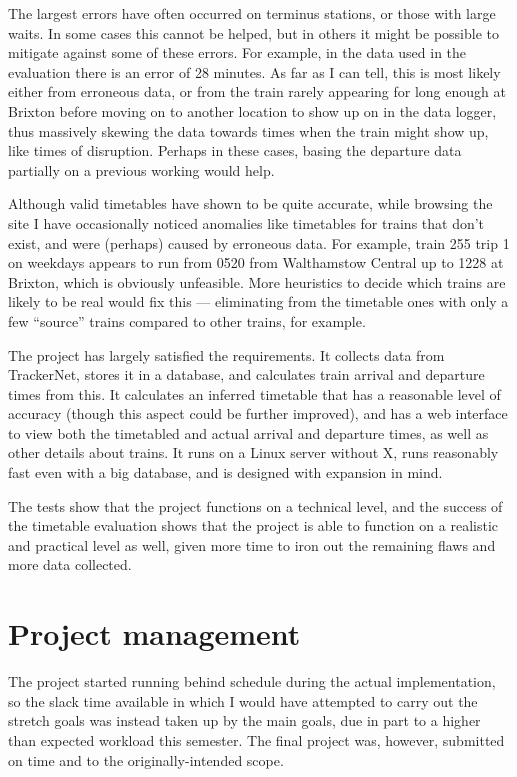 \documentclass[a4paper,12pt,twoside]{report}
\begin{document}
The largest errors have often occurred on terminus stations, or those with
large waits. In some cases this cannot be helped, but in others it might be
possible to mitigate against some of these errors. For example, in the data 
used in the evaluation there is an error of 28 minutes. As far as I can tell,
this is most likely either from erroneous data, or from the train rarely
appearing for long enough at Brixton before moving on to another location to
show up on in the data logger, thus massively skewing the data towards times
when the train might show up, like times of disruption. Perhaps in these cases,
basing the departure data partially on a previous working would help.

Although valid timetables have shown to be quite accurate, while browsing the
site I have occasionally noticed anomalies like timetables for trains that
don't exist, and were (perhaps) caused by erroneous data. For example, train
255 trip 1 on weekdays appears to run from 0520 from Walthamstow Central up to
1228 at Brixton, which is obviously unfeasible. More heuristics to decide which
trains are likely to be real would fix this --- eliminating from the timetable
ones with only a few ``source'' trains compared to other trains, for example.

The project has largely satisfied the requirements. It collects data from
TrackerNet, stores it in a database, and calculates train arrival and departure
times from this. It calculates an inferred timetable that has a reasonable
level of accuracy (though this aspect could be further improved), and has a web
interface to view both the timetabled and actual arrival and departure times,
as well as other details about trains. It runs on a Linux server without X,
runs reasonably fast even with a big database, and is designed with expansion
in mind.

The tests show that the project functions on a technical level, and the success
of the timetable evaluation shows that the project is able to function on a
realistic and practical level as well, given more time to iron out the
remaining flaws and more data collected.

\chapter{Project management}

The project started running behind schedule during the actual implementation,
so the slack time available in which I would have attempted to carry out the
stretch goals was instead taken up by the main goals, due in part to a higher
than expected workload this semester. The final project was, however, submitted
on time and to the originally-intended scope.
\end{document}
